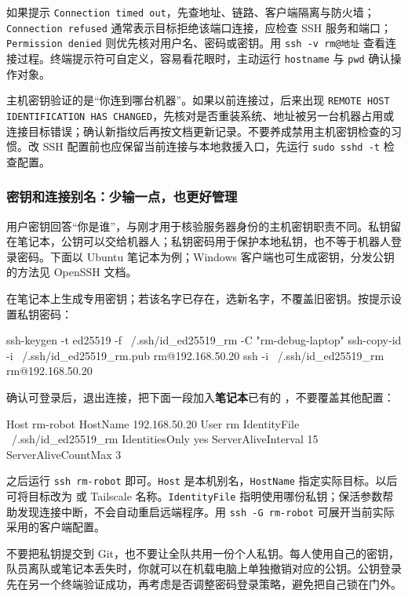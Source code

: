如果提示 \texttt{Connection timed out}，先查地址、链路、客户端隔离与防火墙；\texttt{Connection refused} 通常表示目标拒绝该端口连接，应检查 SSH 服务和端口；\texttt{Permission denied} 则优先核对用户名、密码或密钥。用 \texttt{ssh -v rm@地址} 查看连接过程。终端提示符可自定义，容易看花眼时，主动运行 \texttt{hostname} 与 \texttt{pwd} 确认操作对象。

\begin{note}
主机密钥验证的是“你连到哪台机器”。如果以前连接过，后来出现 \texttt{REMOTE HOST IDENTIFICATION HAS CHANGED}，先核对是否重装系统、地址被另一台机器占用或连接目标错误；确认新指纹后再按文档更新记录。不要养成禁用主机密钥检查的习惯。改 SSH 配置前也应保留当前连接与本地救援入口，先运行 \texttt{sudo sshd -t} 检查配置。
\end{note}

\subsubsection{密钥和连接别名：少输一点，也更好管理}

用户密钥回答“你是谁”，与刚才用于核验服务器身份的主机密钥职责不同。私钥留在笔记本，公钥可以交给机器人；私钥密码用于保护本地私钥，也不等于机器人登录密码。下面以 Ubuntu 笔记本为例；Windows 客户端也可生成密钥，分发公钥的方法见 OpenSSH 文档。

\begin{example}[给自己的调试连接建档]
在笔记本上生成专用密钥；若该名字已存在，选新名字，不覆盖旧密钥。按提示设置私钥密码：
\begin{tbash}
ssh-keygen -t ed25519 -f ~/.ssh/id_ed25519_rm -C "rm-debug-laptop"
ssh-copy-id -i ~/.ssh/id_ed25519_rm.pub rm@192.168.50.20
ssh -i ~/.ssh/id_ed25519_rm rm@192.168.50.20
\end{tbash}
确认可登录后，退出连接，把下面一段加入\textbf{笔记本}已有的 ，不要覆盖其他配置：
\begin{tbash}
Host rm-robot
    HostName 192.168.50.20
    User rm
    IdentityFile ~/.ssh/id_ed25519_rm
    IdentitiesOnly yes
    ServerAliveInterval 15
    ServerAliveCountMax 3
\end{tbash}
之后运行 \texttt{ssh rm-robot} 即可。\texttt{Host} 是本机别名，\texttt{HostName} 指定实际目标。以后可将目标改为  或 Tailscale 名称。\texttt{IdentityFile} 指明使用哪份私钥；保活参数帮助发现连接中断，不会自动重启远端程序。用 \texttt{ssh -G rm-robot} 可展开当前实际采用的客户端配置。
\end{example}

不要把私钥提交到 Git，也不要让全队共用一份个人私钥。每人使用自己的密钥，队员离队或笔记本丢失时，你就可以在机载电脑上单独撤销对应的公钥。公钥登录先在另一个终端验证成功，再考虑是否调整密码登录策略，避免把自己锁在门外。

